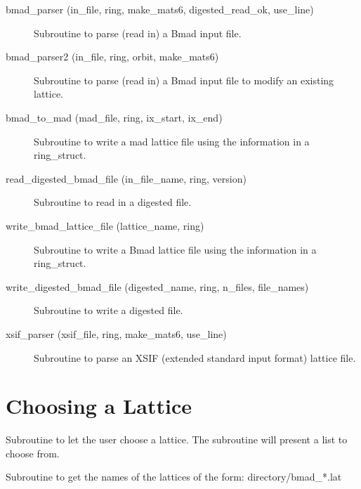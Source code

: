 \begin{description}

\item[bmad\_parser (in\_file, ring, make\_mats6, digested\_read\_ok, use\_line)] \Newline
Subroutine to parse (read in) a Bmad input file. 

\item[bmad\_parser2 (in\_file, ring, orbit, make\_mats6)] \Newline
Subroutine to parse (read in) a Bmad input file to modify an existing lattice. 

\item[bmad\_to\_mad (mad\_file, ring, ix\_start, ix\_end)] \Newline 
Subroutine to write a mad lattice file using the information in
a ring\_struct. 

\item[read\_digested\_bmad\_file (in\_file\_name, ring, version)] \Newline
Subroutine to read in a digested file. 

\item[write\_bmad\_lattice\_file (lattice\_name, ring)] \Newline 
Subroutine to write a Bmad lattice file using the information in
a ring\_struct.

\item[write\_digested\_bmad\_file (digested\_name, ring, n\_files, file\_names)] \Newline
Subroutine to write a digested file. 

\item[xsif\_parser (xsif\_file, ring, make\_mats6, use\_line)] \Newline 
     Subroutine to parse an XSIF (extended standard input format) lattice file.

\end{description}

\section{Choosing a Lattice}
\label{r:lat}

\begin{description}

\item[choose\_cesr\_lattice (lattice, lat\_file, current\_lat, ring)] \Newline
Subroutine to let the user choose a lattice. The subroutine will present a list to choose from. 

\item[get\_lattice\_list (lat\_list, num\_lats, directory)] \Newline
Subroutine to get the names of the lattices of the form: directory/bmad\_*.lat 

\end{description}

